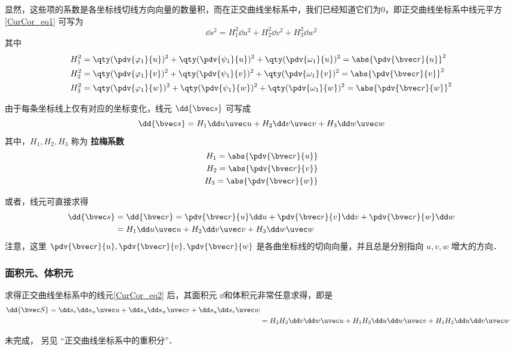 显然，这些项的系数是各坐标线切线方向向量的数量积，而在正交曲线坐标系中，我们已经知道它们为0，即正交曲线坐标系中线元平方\autoref{CurCor_eq1} 可写为
\begin{equation}
\dd s^2=H_1^2\dd u^2+H_2^2\dd v^2+H_3^2\dd w^2
\end{equation}
其中
\begin{equation}
\begin{aligned}
&H_1^2=\qty(\pdv{\varphi_1}{u})^2+\qty(\pdv{\psi_1}{u})^2+\qty(\pdv{\omega_1}{u})^2=\abs{\pdv{\bvec r}{u}}^2\\
&H_2^2=\qty(\pdv{\varphi_1}{v})^2+\qty(\pdv{\psi_1}{v})^2+\qty(\pdv{\omega_1}{v})^2=\abs{\pdv{\bvec r}{v}}^2\\
&H_3^2=\qty(\pdv{\varphi_1}{w})^2+\qty(\pdv{\psi_1}{w})^2+\qty(\pdv{\omega_1}{w})^2=\abs{\pdv{\bvec r}{w}}^2
\end{aligned}
\end{equation}

由于每条坐标线上仅有对应的坐标变化，线元 $\dd {\bvec s}$ 可写成
\begin{equation}
\dd {\bvec s}=H_1\dd u\uvec u+H_2\dd v\uvec v+H_3\dd w\uvec w
\end{equation}
其中，$H_1,H_2,H_3$ 称为 \textbf{拉梅系数}
\begin{equation}
\begin{aligned}
H_1=\abs{\pdv{\bvec r}{u}}\\
H_2=\abs{\pdv{\bvec r}{v}}\\
H_3=\abs{\pdv{\bvec r}{w}}
\end{aligned}
\end{equation}

或者，线元可直接求得
\begin{equation}\label{CurCor_eq2}
\begin{aligned}
\dd {\bvec s}&=\dd {\bvec r}=\pdv{\bvec r}{u}\dd u+\pdv{\bvec r}{v}\dd v+\pdv{\bvec r}{w}\dd w\\
&=H_1\dd u\uvec u+H_2\dd v\uvec v+H_3\dd w\uvec w
\end{aligned}
\end{equation}
注意，这里 $\pdv{\bvec r}{u},\pdv{\bvec r}{v},\pdv{\bvec r}{w}$ 是各曲坐标线的切向向量，并且总是分别指向 $u,v,w$ 增大的方向．
\subsubsection{面积元、体积元}
求得正交曲线坐标系中的线元\autoref{CurCor_eq2} 后，其面积元 $\dd$和体积元非常任意求得，即是
\begin{equation}
\begin{aligned}
\dd {\bvec S}=\dd s_v\dd s _w \uvec u+\dd s_u\dd s _w \uvec v+\dd s_u\dd s _v \uvec w\\
&=H_2H_3\dd v\dd w\uvec u+H_1H_3\dd u\dd w\uvec v+H_1H_2\dd u\dd v\uvec w
\end{aligned}
\end{equation}


未完成， 另见 “正交曲线坐标系中的重积分”．
